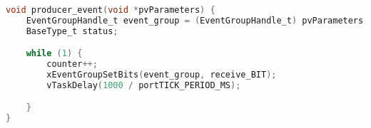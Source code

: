 \begin{lstlisting}[language=c,caption=Problem 4.3 Producer Task, label=list:p4_3_prod]
void producer_event(void *pvParameters) {
    EventGroupHandle_t event_group = (EventGroupHandle_t) pvParameters;
    BaseType_t status;

    while (1) {
        counter++;
        xEventGroupSetBits(event_group, receive_BIT);
        vTaskDelay(1000 / portTICK_PERIOD_MS);

    }
}
\end{lstlisting}
